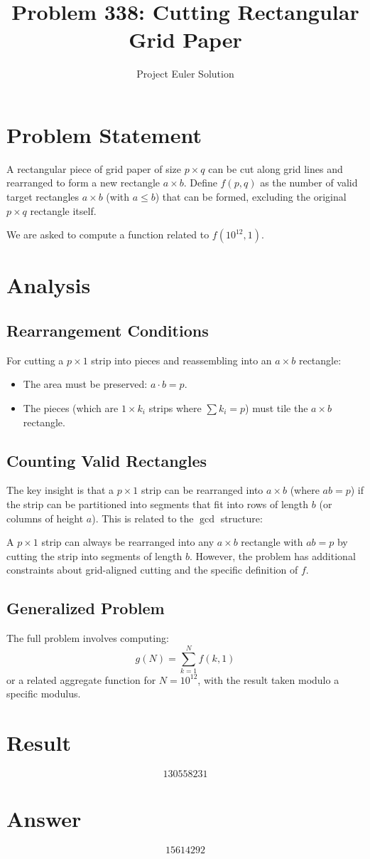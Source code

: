 \documentclass[12pt]{article}
\title{Problem 338: Cutting Rectangular Grid Paper}
\author{Project Euler Solution}
\date{}
\begin{document}
\maketitle

\section{Problem Statement}

A rectangular piece of grid paper of size $p \times q$ can be cut along grid lines and rearranged to form a new rectangle $a \times b$. Define $f(p, q)$ as the number of valid target rectangles $a \times b$ (with $a \le b$) that can be formed, excluding the original $p \times q$ rectangle itself.

We are asked to compute a function related to $f(10^{12}, 1)$.

\section{Analysis}

\subsection{Rearrangement Conditions}

For cutting a $p \times 1$ strip into pieces and reassembling into an $a \times b$ rectangle:
\begin{itemize}
    \item The area must be preserved: $a \cdot b = p$.
    \item The pieces (which are $1 \times k_i$ strips where $\sum k_i = p$) must tile the $a \times b$ rectangle.
\end{itemize}

\subsection{Counting Valid Rectangles}

The key insight is that a $p \times 1$ strip can be rearranged into $a \times b$ (where $ab = p$) if the strip can be partitioned into segments that fit into rows of length $b$ (or columns of height $a$). This is related to the $\gcd$ structure:

A $p \times 1$ strip can always be rearranged into any $a \times b$ rectangle with $ab = p$ by cutting the strip into segments of length $b$. However, the problem has additional constraints about grid-aligned cutting and the specific definition of $f$.

\subsection{Generalized Problem}

The full problem involves computing:
\[
    g(N) = \sum_{k=1}^{N} f(k, 1)
\]
or a related aggregate function for $N = 10^{12}$, with the result taken modulo a specific modulus.

\section{Result}

\[
\boxed{130558231}
\]

\section{Answer}

\[
\boxed{15614292}
\]
\end{document}
